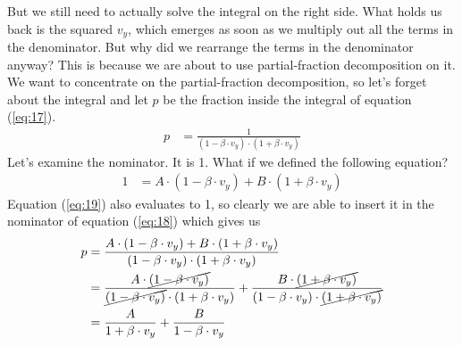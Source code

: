 \documentclass[paper=a4, fontsize=11pt]{scrartcl} %
\numberwithin{equation}{section} %
\numberwithin{figure}{section} %
\numberwithin{table}{section} %
\begin{document}
But we still need to actually solve the integral on the right side. What holds us back is the squared $v_y$, which emerges as soon as we
multiply out all the terms in the denominator. But why did we rearrange the terms in the denominator anyway? This is because we are about to
use partial-fraction decomposition on it. We want to concentrate on the partial-fraction decomposition, so let's 
forget about the integral and let $p$ be the fraction inside the integral of equation (\ref{eq:17}).
\begin{align} \label{eq:18}
p &= \frac{1}{(1 - \beta \cdot v_y)\cdot (1 + \beta \cdot v_y)}
\end{align}
Let's examine the nominator. It is 1. What if we defined the following equation?
\begin{align} \label{eq:19}
1 &= A \cdot (1 - \beta \cdot v_y) + B \cdot (1 + \beta \cdot v_y)
\end{align}
Equation (\ref{eq:19}) also evaluates to 1, so clearly we are able to insert it in the nominator of equation (\ref{eq:18})
which gives us
\begin{align} 
p &= \frac{A \cdot (1 - \beta \cdot v_y) + B \cdot (1 + \beta \cdot v_y)}{(1 - \beta \cdot v_y)\cdot (1 + \beta \cdot v_y)} \\
  &= \frac{A \cdot \cancel{(1 - \beta \cdot v_y)}}{\cancel{(1 - \beta \cdot v_y)}\cdot (1 + \beta \cdot v_y)} +
     \frac{B \cdot \cancel{(1 + \beta \cdot v_y)}}{(1 - \beta \cdot v_y)\cdot \cancel{(1 + \beta \cdot v_y)}} \\
  &= \frac{A}{1 + \beta \cdot v_y} + \frac{B}{1 - \beta \cdot v_y} \label{eq:20}
\end{align}
\end{document}
